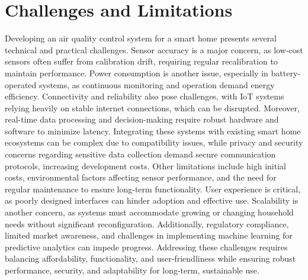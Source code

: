\documentclass[USenglish,oneside,twocolumn]{article}
\begin{document}
\section{Challenges and Limitations}
Developing an air quality control system for a smart home presents several technical and practical challenges. Sensor accuracy is a major concern, as low-cost sensors often suffer from calibration drift, requiring regular recalibration to maintain performance. Power consumption is another issue, especially in battery-operated systems, as continuous monitoring and operation demand energy efficiency. Connectivity and reliability also pose challenges, with IoT systems relying heavily on stable internet connections, which can be disrupted. Moreover, real-time data processing and decision-making require robust hardware and software to minimize latency. Integrating these systems with existing smart home ecosystems can be complex due to compatibility issues, while privacy and security concerns regarding sensitive data collection demand secure communication protocols, increasing development costs. Other limitations include high initial costs, environmental factors affecting sensor performance, and the need for regular maintenance to ensure long-term functionality. User experience is critical, as poorly designed interfaces can hinder adoption and effective use. Scalability is another concern, as systems must accommodate growing or changing household needs without significant reconfiguration. Additionally, regulatory compliance, limited market awareness, and challenges in implementing machine learning for predictive analytics can impede progress. Addressing these challenges requires balancing affordability, functionality, and user-friendliness while ensuring robust performance, security, and adaptability for long-term, sustainable use.
\end{document}
